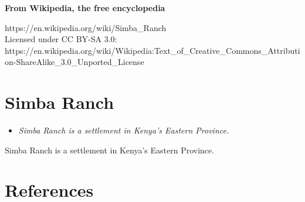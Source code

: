 \textbf{From Wikipedia, the free encyclopedia}

https://en.wikipedia.org/wiki/Simba\_Ranch\\
Licensed under CC BY-SA 3.0:\\
https://en.wikipedia.org/wiki/Wikipedia:Text\_of\_Creative\_Commons\_Attribution-ShareAlike\_3.0\_Unported\_License

\section{Simba Ranch}\label{simba-ranch}

\begin{itemize}
\item
  \emph{Simba Ranch is a settlement in Kenya's Eastern Province.}
\end{itemize}

Simba Ranch is a settlement in Kenya's Eastern Province.

\section{References}\label{references}
